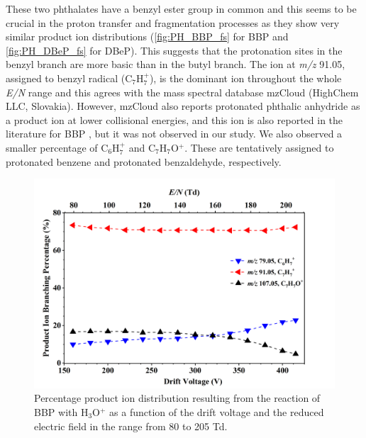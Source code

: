 These two phthalates have a benzyl ester group in common and this seems to be crucial in the proton transfer and fragmentation processes as they show very similar product ion distributions (\autoref{fig:PH_BBP_fs} for BBP and \autoref{fig:PH_DBeP_fs} for DBeP).
This suggests that the protonation sites in the benzyl branch are more basic than in the butyl branch.
The ion at \textit{m/z} 91.05, assigned to benzyl radical (C$_7$H$_7^+$), is the dominant ion throughout the whole \textit{E/N} range and this agrees with the mass spectral database mzCloud (HighChem LLC, Slovakia). However, mzCloud also reports protonated phthalic anhydride as a product ion at lower collisional energies, and this ion is also reported in the literature for BBP  \cite{earls2003gas}, but it was not observed in our study. 
We also observed a smaller percentage of C$_6$H$_7^+$ and C$_7$H$_7$O$^+$. These are  tentatively assigned to protonated benzene and protonated benzaldehyde, respectively.




\begin{figure}[htb]%
\centering
\includegraphics[height=0.4\textheight]{pics/BBP-BR.png}
\caption{Percentage product ion distribution resulting from the reaction of BBP with H$_3$O$^+$ as a function of the drift voltage and the reduced electric field in the range from 80 to 205 Td.}
\label{fig:PH_BBP_fs}
\end{figure}


